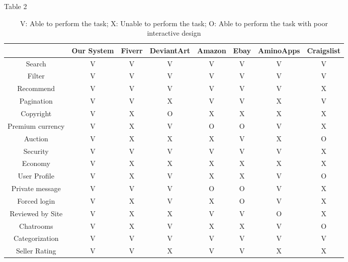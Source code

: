 \documentclass[]{article}
\begin{document}
	Table 2
	\begin{table}[!htb]
		\begin{tabular}{|c|c|c|c|c|c|c|c|}
			\hline  & Our System & Fiverr & DeviantArt & Amazon & Ebay & AminoApps & Craigslist \\
			\hline Search & V & V & V & V & V & V & V\\
			\hline Filter & V & V & V & V & V & V & V\\
			\hline Recommend & V & V & V & V & V & V & X\\
			\hline Pagination & V & V & X & V & V & X & V\\
			\hline Copyright & V & X & O & X & X & X & X\\
			\hline Premium currency & V & X & V & O & O & V & X\\
			\hline Auction & V & X & X & X & V & X & O\\
			\hline Security & V & V & V & V & V & V & X\\
			\hline Economy & V & X & X & X & X & X & X\\
			\hline User Profile & V & X & V & X & X & V & O\\
			\hline Private message & V & V & V & O & O & V & X\\
			\hline Forced login & V & X & V & X & O & V & X\\
			\hline Reviewed by Site & V & X & X & V & V & O & X\\
			\hline Chatrooms & V & X & V & X & X & V & O\\
			\hline Categorization & V & V & V & V & V & V & V\\
			\hline Seller Rating & V & V & X & V & V & X & X\\ 
			\hline
		\end{tabular}
		\caption{V: Able to perform the task; X: Unable to perform the task; O: Able to perform the task with poor interactive design}
		\end{table}
	
	
	
\end{document}
